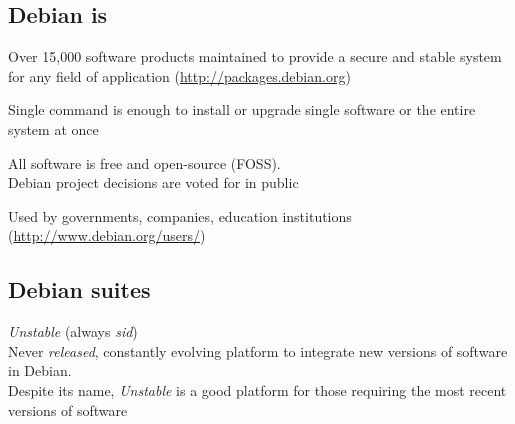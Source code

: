 \documentclass[letterpaper,landscape]{report}
\begin{document}
\begin{multicols}{3}
\subsection*{Debian is}
\begin{description}[nolistsep,leftmargin=0.8em,style=nextline]
\item[V\textnormal{ersatile}] Over 15,000 software products maintained to provide
  a secure and stable system for any field of application
  (\url{http://packages.debian.org})
\item[S\textnormal{imple}] Single command is enough to install or upgrade single
  software or the entire system at once
\item[O\textnormal{pen}] All software is free and open-source (FOSS).\\
  Debian project decisions are voted for in public
\item[P\textnormal{opular}] Used by governments, companies, education
  institutions (\url{http://www.debian.org/users/})
\end{description}

\subsection*{Debian suites}


\begin{description}[nolistsep,leftmargin=1pc,topsep=1em]

\item[Development]\hfill\emph{Unstable} (always \emph{sid})\\
  Never \emph{released}, constantly evolving platform to integrate new
  versions of software in Debian.\\
  Despite its name, \emph{Unstable} is a good platform for those
  requiring the most recent versions of software


\end{description}
\end{multicols}
\end{document}
